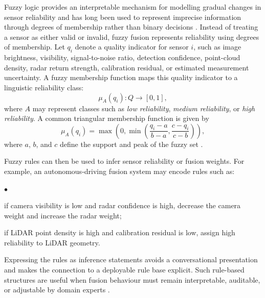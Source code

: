 \documentclass{ieeeaccess}
\newenvironment{list4a}{
  \begin{list}{$\bullet$}{%
      \setlength{\itemsep}{0.05cm}
      \setlength{\labelsep}{0.2cm}
      \setlength{\labelwidth}{0.3cm}
      \setlength{\parsep}{0in}
      \setlength{\parskip}{0in}
      \setlength{\topsep}{0in}
      \setlength{\partopsep}{0in}
      \setlength{\leftmargin}{0.16in}}}
      {\end{list}}
\begin{document}
Fuzzy logic provides an interpretable mechanism for modelling gradual changes in sensor reliability and has long been used to represent imprecise information through degrees of membership rather than binary decisions \cite{zadeh_fuzzy_1965}. Instead of treating a sensor as either valid or invalid, fuzzy fusion represents reliability using degrees of membership. Let $q_i$ denote a quality indicator for sensor $i$, such as image brightness, visibility, signal-to-noise ratio, detection confidence, point-cloud density, radar return strength, calibration residual, or estimated measurement uncertainty. A fuzzy membership function maps this quality indicator to a linguistic reliability class:
\begin{equation}
    \mu_A(q_i): Q \rightarrow [0,1],
\end{equation}
where $A$ may represent classes such as \emph{low reliability}, \emph{medium reliability}, or \emph{high reliability}. A common triangular membership function is given by
\begin{equation}
    \mu_A(q_i) =
    \max\left(0,
    \min\left(
    \frac{q_i-a}{b-a},
    \frac{c-q_i}{c-b}
    \right)\right),
\end{equation}
where $a$, $b$, and $c$ define the support and peak of the fuzzy set \cite{zadeh_fuzzy_1965}.

Fuzzy rules can then be used to infer sensor reliability or fusion weights. For example, an autonomous-driving fusion system may encode rules such as:
\begin{list4a}
    \item if camera visibility is low and radar confidence is high, decrease the camera weight and increase the radar weight;
    \item if LiDAR point density is high and calibration residual is low, assign high reliability to LiDAR geometry.
\end{list4a}
Expressing the rules as inference statements avoids a conversational presentation and makes the connection to a deployable rule base explicit. Such rule-based structures are useful when fusion behaviour must remain interpretable, auditable, or adjustable by domain experts \cite{zadeh_fuzzy_1965, khaleghi_multisensor_2013}.
\end{document}
